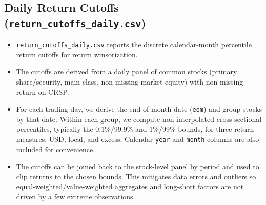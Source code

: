 \documentclass[12pt,title,fleqn]{article}
\begin{document}
\subsection{Daily Return Cutoffs (\texttt{return\_cutoffs\_daily.csv})}
\begin{itemize}
    \item \texttt{return\_cutoffs\_daily.csv} reports the discrete calendar-month percentile return cutoffs for return winsorization.
    \item The cutoffs are derived from a daily panel of common stocks (primary share/security, main class, non-missing market equity) with non-missing return on CRSP.
    \item For each trading day, we derive the end-of-month date (\texttt{eom}) and group stocks by that date. Within each group, we compute non-interpolated cross-sectional percentiles, typically the 0.1\%/99.9\% and 1\%/99\% bounds, for three return measures: USD, local, and excess. Calendar \texttt{year} and \texttt{month} columns are also included for convenience.
    \item The cutoffs can be joined back to the stock-level panel by period and used to clip returns to the chosen bounds. This mitigates data errors and outliers so equal-weighted/value-weighted aggregates and long-short factors are not driven by a few extreme observations.
\end{itemize}
\end{document}
